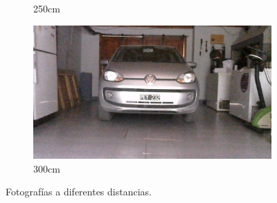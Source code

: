 \begin{figure}
\begin{subfigure}{.3\textwidth}
        \caption{250cm}
    \end{subfigure}
    \begin{subfigure}{.3\textwidth}
        \centering
        \includegraphics[width=\textwidth]{imgs/test-distancia/0_300.jpg}
        \caption{300cm}
    \end{subfigure}
    \caption{Fotografías a diferentes distancias.}
    \label{fig:fotos-distancia}
\end{figure}

